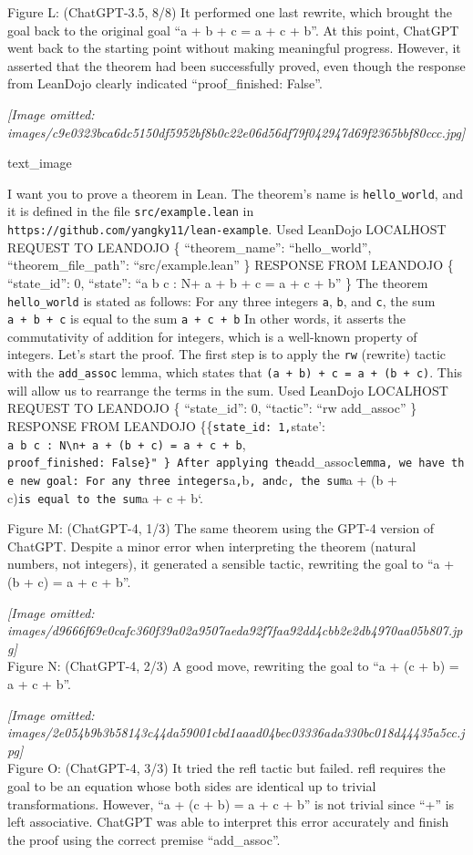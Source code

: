 \documentclass[
]{article}
\begin{document}
Figure L: (ChatGPT-3.5, 8/8) It performed one last rewrite, which
brought the goal back to the original goal ``a + b + c = a + c + b''. At
this point, ChatGPT went back to the starting point without making
meaningful progress. However, it asserted that the theorem had been
successfully proved, even though the response from LeanDojo clearly
indicated ``proof\_finished: False''.

\textit{[Image omitted: images/c9e0323bca6dc5150df5952bf8b0c22e06d56df79f042947d69f2365bbf80ccc.jpg]}

text\_image

I want you to prove a theorem in Lean. The theorem's name is
\texttt{hello\_world}, and it is defined in the file
\texttt{src/example.lean} in
\texttt{https://github.com/yangky11/lean-example}. Used LeanDojo
LOCALHOST REQUEST TO LEANDOJO \{ ``theorem\_name'': ``hello\_world'',
``theorem\_file\_path'': ``src/example.lean'' \} RESPONSE FROM LEANDOJO
\{ ``state\_id'': 0, ``state'': ``a b c : N\n+ a + b + c = a + c + b''
\} The theorem \texttt{hello\_world} is stated as follows: For any three
integers \texttt{a}, \texttt{b}, and \texttt{c}, the sum
\texttt{a\ +\ b\ +\ c} is equal to the sum \texttt{a\ +\ c\ +\ b} In
other words, it asserts the commutativity of addition for integers,
which is a well-known property of integers. Let's start the proof. The
first step is to apply the \texttt{rw} (rewrite) tactic with the
\texttt{add\_assoc} lemma, which states that
\texttt{(a\ +\ b)\ +\ c\ =\ a\ +\ (b\ +\ c)}. This will allow us to
rearrange the terms in the sum. Used LeanDojo LOCALHOST REQUEST TO
LEANDOJO \{ ``state\_id'': 0, ``tactic'': ``rw add\_assoc'' \} RESPONSE
FROM LEANDOJO \{\{\texttt{state\_id\textquotesingle{}:\ 1,}state':
\texttt{a\ b\ c\ :\ N\textbackslash{}n+\ a\ +\ (b\ +\ c)\ =\ a\ +\ c\ +\ b},
\texttt{proof\_finished\textquotesingle{}:\ False\}"\ \}\ After\ applying\ the}add\_assoc\texttt{lemma,\ we\ have\ the\ new\ goal:\ For\ any\ three\ integers}a\texttt{,}b\texttt{,\ and}c\texttt{,\ the\ sum}a
+ (b + c)\texttt{is\ equal\ to\ the\ sum}a + c + b`.

Figure M: (ChatGPT-4, 1/3) The same theorem using the GPT-4 version of
ChatGPT. Despite a minor error when interpreting the theorem (natural
numbers, not integers), it generated a sensible tactic, rewriting the
goal to ``a + (b + c) = a + c + b''.

\textit{[Image omitted: images/d9666f69e0cafc360f39a02a9507aeda92f7faa92dd4cbb2e2db4970aa05b807.jpg]}\\
Figure N: (ChatGPT-4, 2/3) A good move, rewriting the goal to ``a + (c +
b) = a + c + b''.

\textit{[Image omitted: images/2e054b9b3b58143c44da59001cbd1aaad04bec03336ada330bc018d44435a5cc.jpg]}\\
Figure O: (ChatGPT-4, 3/3) It tried the refl tactic but failed. refl
requires the goal to be an equation whose both sides are identical up to
trivial transformations. However, ``a + (c + b) = a + c + b'' is not
trivial since ``+'' is left associative. ChatGPT was able to interpret
this error accurately and finish the proof using the correct premise
``add\_assoc''.
\end{document}
